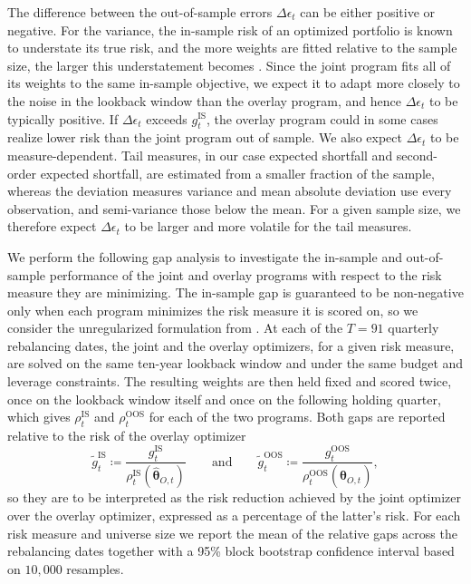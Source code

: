 The difference between the out-of-sample errors $\Delta\epsilon_t$ can be either positive or negative. For the variance, the in-sample risk of an optimized portfolio is known to understate its true risk, and the more
weights are fitted relative to the sample size, the larger this understatement becomes \cite{ElKaroui2010}. Since the joint program fits all of its weights to the same in-sample objective, we expect it to
adapt more closely to the noise in the lookback window than the overlay program, and hence $\Delta\epsilon_t$ to be typically positive. If $\Delta\epsilon_t$ exceeds $g_t^{\text{IS}}$, the overlay program could in some cases realize lower risk than the joint program out of sample. We also expect $\Delta\epsilon_t$ to be measure-dependent. Tail measures, in our case expected shortfall and second-order expected shortfall, are estimated from
a smaller fraction of the sample, whereas the deviation measures variance and mean absolute deviation use every observation, and semi-variance
 those below the mean. For a given sample size, we therefore expect  $\Delta\epsilon_t$ to be larger and more volatile for the tail measures. 

We perform the following gap analysis to investigate the in-sample and out-of-sample performance of the joint and 
overlay programs with respect to the risk measure they are minimizing. The in-sample gap is guaranteed to 
be non-negative only when each program minimizes the risk measure it is scored on, so we consider the 
unregularized formulation from . At each of the $T = 91$ quarterly rebalancing 
dates, the joint and the overlay optimizers, for a given risk measure, are solved on the same ten-year 
lookback window and under the same budget and leverage constraints. The resulting weights are then held fixed 
and scored twice, once on the lookback window itself and once on the following holding quarter, which 
gives $\rho_t^{\text{IS}}$ and $\rho_t^{\text{OOS}}$ for each of the two programs. Both gaps are reported relative to the risk of the overlay optimizer
\vspace{0.3em}
\begin{equation*}
\tilde g_t^{\text{IS}} \coloneqq \frac{g_t^{\text{IS}}}{\rho_t^{\text{IS}}(\hat{\bm{\theta}}_{O,t})}
\qquad \text{and} \qquad
\tilde g_t^{\text{OOS}} \coloneqq \frac{g_t^{\text{OOS}}}{\rho_t^{\text{OOS}}(\hat{\bm{\theta}}_{O,t})},
\end{equation*}
so they are to be interpreted as the risk reduction achieved by the joint optimizer over the overlay optimizer, expressed as a percentage of the latter's risk. For each risk measure and universe size we report the mean of the relative gaps across the rebalancing dates together with a 95\% block bootstrap confidence interval based on $10{,}000$ resamples.

